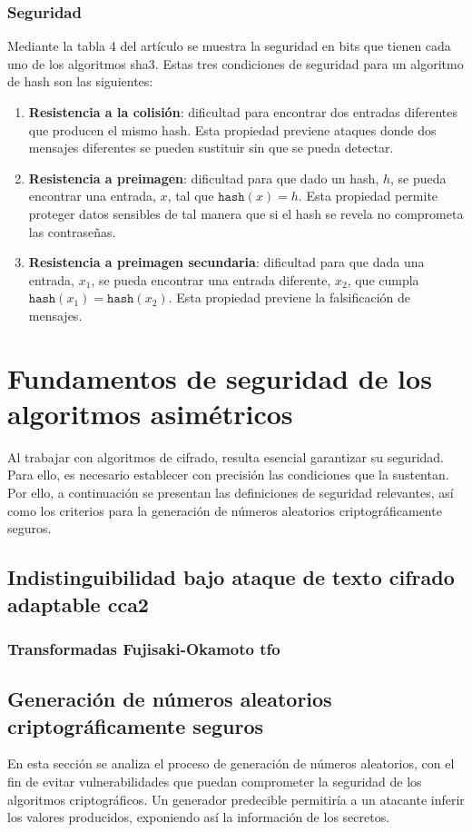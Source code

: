 \subsubsection{Seguridad}
Mediante la tabla 4 del artículo \cite{FIPS202} se muestra la seguridad en bits que tienen cada uno de los algoritmos \gls{sha}3. Estas tres condiciones de seguridad para un algoritmo de hash son las siguientes:
\begin{enumerate}
	\item \textbf{Resistencia a la colisión}: dificultad para encontrar dos entradas diferentes que producen el mismo hash. Esta propiedad previene ataques donde dos mensajes diferentes se pueden sustituir sin que se pueda detectar.
	\item \textbf{Resistencia a preimagen}: dificultad para que dado un hash, \(h\), se pueda encontrar una entrada, \(x\), tal que \(\texttt{hash}(x)=h\). Esta propiedad permite proteger datos sensibles de tal manera que si el hash se revela no comprometa las contraseñas. 
	\item \textbf{Resistencia a preimagen secundaria}: dificultad para que dada una entrada, \(x_1\), se pueda encontrar una entrada diferente, \(x_2\), que cumpla \(\texttt{hash}(x_1)=\texttt{hash}(x_2)\). Esta propiedad previene la falsificación de mensajes.
\end{enumerate}
\newpage

\section{Fundamentos de seguridad de los algoritmos asimétricos}
Al trabajar con algoritmos de cifrado, resulta esencial garantizar su seguridad. Para ello, es necesario establecer con precisión las condiciones que la sustentan. Por ello, a continuación se presentan las definiciones de seguridad relevantes, así como los criterios para la generación de números aleatorios criptográficamente seguros.

\subsection{Indistinguibilidad bajo ataque de texto cifrado adaptable \gls{cca2}}
\cite{CCA2}
\subsubsection{Transformadas Fujisaki-Okamoto \gls{tfo}}
\cite{Fujisaki1999}

\subsection{Generación de números aleatorios criptográficamente seguros}
En esta sección se analiza el proceso de generación de números aleatorios, con el fin de evitar vulnerabilidades que puedan comprometer la seguridad de los algoritmos criptográficos. Un generador predecible permitiría a un atacante inferir los valores producidos, exponiendo así la información de los secretos.
